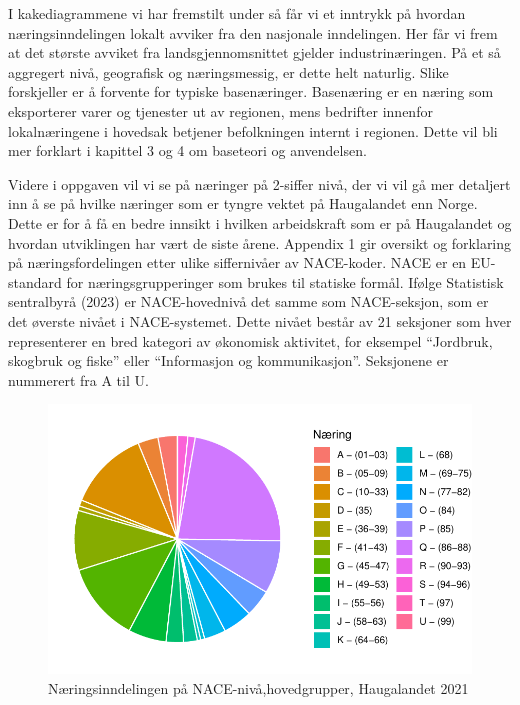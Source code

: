 \documentclass[
]{article}
\begin{document}
I kakediagrammene vi har fremstilt under så får vi et inntrykk på
hvordan næringsinndelingen lokalt avviker fra den nasjonale inndelingen.
Her får vi frem at det største avviket fra landsgjennomsnittet gjelder
industrinæringen. På et så aggregert nivå, geografisk og næringsmessig,
er dette helt naturlig. Slike forskjeller er å forvente for typiske
basenæringer. Basenæring er en næring som eksporterer varer og tjenester
ut av regionen, mens bedrifter innenfor lokalnæringene i hovedsak
betjener befolkningen internt i regionen. Dette vil bli mer forklart i
kapittel 3 og 4 om baseteori og anvendelsen.

Videre i oppgaven vil vi se på næringer på 2-siffer nivå, der vi vil gå
mer detaljert inn å se på hvilke næringer som er tyngre vektet på
Haugalandet enn Norge. Dette er for å få en bedre innsikt i hvilken
arbeidskraft som er på Haugalandet og hvordan utviklingen har vært de
siste årene. Appendix 1 gir oversikt og forklaring på næringsfordelingen
etter ulike siffernivåer av NACE-koder. NACE er en EU-standard for
næringsgrupperinger som brukes til statiske formål. Ifølge Statistisk
sentralbyrå (2023) er NACE-hovednivå det samme som NACE-seksjon, som er
det øverste nivået i NACE-systemet. Dette nivået består av 21 seksjoner
som hver representerer en bred kategori av økonomisk aktivitet, for
eksempel ``Jordbruk, skogbruk og fiske'' eller ``Informasjon og
kommunikasjon''. Seksjonene er nummerert fra A til U.

\begin{figure}[H]

{\centering \includegraphics{Masteroppgave_files/figure-pdf/fig-kake-haugalandet-1.pdf}

}

\caption{\label{fig-kake-haugalandet}Næringsinndelingen på
NACE-nivå,hovedgrupper, Haugalandet 2021}

\end{figure}
\end{document}
